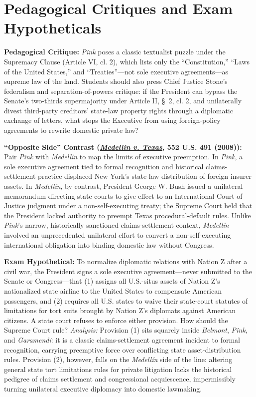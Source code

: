 \documentclass[12pt]{article}
\begin{document}
\section{Pedagogical Critiques and Exam Hypotheticals}
\textbf{Pedagogical Critique:} \textit{Pink} poses a classic textualist puzzle under the Supremacy Clause (Article VI, cl. 2), which lists only the ``Constitution,'' ``Laws of the United States,'' and ``Treaties''---not sole executive agreements---as supreme law of the land. Students should also press Chief Justice Stone's federalism and separation-of-powers critique: if the President can bypass the Senate's two-thirds supermajority under Article II, \S~2, cl. 2, and unilaterally divest third-party creditors' state-law property rights through a diplomatic exchange of letters, what stops the Executive from using foreign-policy agreements to rewrite domestic private law?

\textbf{``Opposite Side'' Contrast (\href{https://supreme.justia.com/cases/federal/us/552/491/}{\textit{Medell\'in v. Texas}}, 552 U.S. 491 (2008)):} Pair \textit{Pink} with \textit{Medell\'in} to map the limits of executive preemption. In \textit{Pink}, a sole executive agreement tied to formal recognition and historical claims-settlement practice displaced New York's state-law distribution of foreign insurer assets. In \textit{Medell\'in}, by contrast, President George W. Bush issued a unilateral memorandum directing state courts to give effect to an International Court of Justice judgment under a non-self-executing treaty; the Supreme Court held that the President lacked authority to preempt Texas procedural-default rules. Unlike \textit{Pink}'s narrow, historically sanctioned claims-settlement context, \textit{Medell\'in} involved an unprecedented unilateral effort to convert a non-self-executing international obligation into binding domestic law without Congress.

\textbf{Exam Hypothetical:} To normalize diplomatic relations with Nation Z after a civil war, the President signs a sole executive agreement---never submitted to the Senate or Congress---that (1) assigns all U.S.-situs assets of Nation Z's nationalized state airline to the United States to compensate American passengers, and (2) requires all U.S. states to waive their state-court statutes of limitations for tort suits brought by Nation Z's diplomats against American citizens. A state court refuses to enforce either provision. How should the Supreme Court rule? \textit{Analysis:} Provision (1) sits squarely inside \textit{Belmont}, \textit{Pink}, and \textit{Garamendi}: it is a classic claims-settlement agreement incident to formal recognition, carrying preemptive force over conflicting state asset-distribution rules. Provision (2), however, falls on the \textit{Medell\'in} side of the line: altering general state tort limitations rules for private litigation lacks the historical pedigree of claims settlement and congressional acquiescence, impermissibly turning unilateral executive diplomacy into domestic lawmaking.
\end{document}
